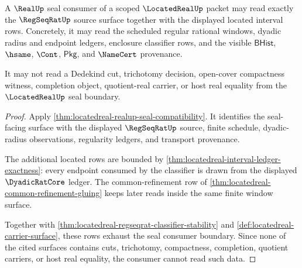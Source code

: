 \begin{theorem}
\label{thm:locatedreal-scope-real-seal-consumer}
A $\RealUp$ seal consumer of a scoped $\LocatedRealUp$ packet may read exactly the $\RegSeqRatUp$ source surface together with the displayed located interval rows. Concretely, it may read the scheduled regular rational windows, dyadic radius and endpoint ledgers, enclosure classifier rows, and the visible $\mathsf{BHist}$, $\hsame$, $\Cont$, $\mathsf{Pkg}$, and $\NameCert$ provenance.

It may not read a Dedekind cut, trichotomy decision, open-cover compactness witness, completion object, quotient-real carrier, or host real equality from the $\LocatedRealUp$ seal boundary.
\end{theorem}
\begin{proof}
Apply \autoref{thm:locatedreal-realup-seal-compatibility}. It identifies the seal-facing surface with the displayed $\RegSeqRatUp$ source, finite schedule, dyadic-radius observations, regularity ledgers, and transport provenance.

The additional located rows are bounded by \autoref{thm:locatedreal-interval-ledger-exactness}: every endpoint consumed by the classifier is drawn from the displayed $\DyadicRatCore$ ledger. The common-refinement row of \autoref{thm:locatedreal-common-refinement-gluing} keeps later reads inside the same finite window surface.

Together with \autoref{thm:locatedreal-regseqrat-classifier-stability} and \autoref{def:locatedreal-carrier-surface}, these rows exhaust the seal consumer boundary. Since none of the cited surfaces contains cuts, trichotomy, compactness, completion, quotient carriers, or host real equality, the consumer cannot read such data.
\end{proof}

